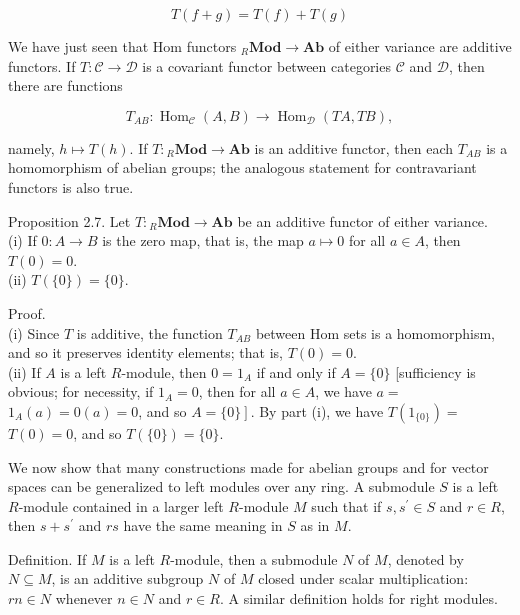 \documentclass[10pt]{article}
\begin{document}
$$
T(f+g)=T(f)+T(g)
$$

We have just seen that Hom functors ${ }_{R} \mathbf{M o d} \rightarrow \mathbf{A b}$ of either variance are additive functors. If $T: \mathcal{C} \rightarrow \mathcal{D}$ is a covariant functor between categories $\mathcal{C}$ and $\mathcal{D}$, then there are functions

$$
T_{A B}: \operatorname{Hom}_{\mathcal{C}}(A, B) \rightarrow \operatorname{Hom}_{\mathcal{D}}(T A, T B),
$$

namely, $h \mapsto T(h)$. If $T:{ }_{R} \mathbf{M o d} \rightarrow \mathbf{A b}$ is an additive functor, then each $T_{A B}$ is a homomorphism of abelian groups; the analogous statement for contravariant functors is also true.

Proposition 2.7. Let $T:{ }_{R} \mathbf{M o d} \rightarrow \mathbf{A b}$ be an additive functor of either variance.\\
(i) If $0: A \rightarrow B$ is the zero map, that is, the map $a \mapsto 0$ for all $a \in A$, then $T(0)=0$.\\
(ii) $T(\{0\})=\{0\}$.

Proof.\\
(i) Since $T$ is additive, the function $T_{A B}$ between Hom sets is a homomorphism, and so it preserves identity elements; that is, $T(0)=0$.\\
(ii) If $A$ is a left $R$-module, then $0=1_{A}$ if and only if $A=\{0\}$ [sufficiency is obvious; for necessity, if $1_{A}=0$, then for all $a \in A$, we have $a=$ $1_{A}(a)=0(a)=0$, and so $\left.A=\{0\}\right]$. By part (i), we have $T\left(1_{\{0\}}\right)=$ $T(0)=0$, and so $T(\{0\})=\{0\}$.

We now show that many constructions made for abelian groups and for vector spaces can be generalized to left modules over any ring. A submodule $S$ is a left $R$-module contained in a larger left $R$-module $M$ such that if $s, s^{\prime} \in S$ and $r \in R$, then $s+s^{\prime}$ and $r s$ have the same meaning in $S$ as in $M$.

Definition. If $M$ is a left $R$-module, then a submodule $N$ of $M$, denoted by $N \subseteq M$, is an additive subgroup $N$ of $M$ closed under scalar multiplication: $r n \in N$ whenever $n \in N$ and $r \in R$. A similar definition holds for right modules.
\end{document}
